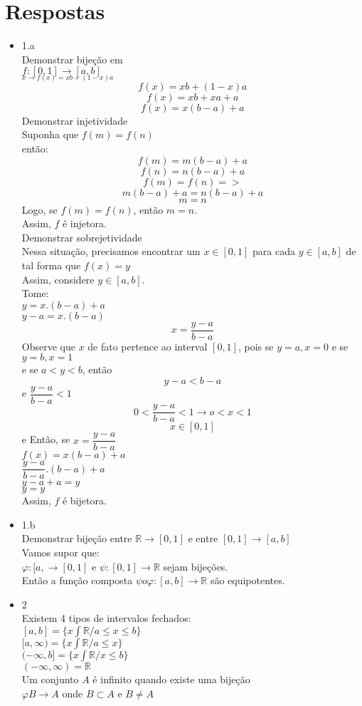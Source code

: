 \documentclass[]{article}
\begin{document}
	\section{Respostas}
	\begin{itemize}
		\item 1.a\\
			Demonstrar bijeção em\\
			$f:[0,1] \to [a,b]$\\			
			$_{x \to f(x) =xb+(1-x)a}$\\
			$$f(x) = xb+(1-x)a$$
			$$f(x) = xb +xa +a$$
			$$f(x) = x(b-a)+a$$
			Demonstrar injetividade\\
			Suponha que $f(m)=f(n)$\\
			então:
			$$f(m)=m(b-a)+a$$
			$$f(n) =n(b-a)+a$$
			$$f(m)=f(n) =>$$
			$$m(b-a)+a = n(b-a)+a$$
			$$m=n$$
			Logo, se $f(m)=f(n)$, então $m=n$.\\
			Assim, $f$ é injetora.\\
			Demonstrar sobrejetividade\\
			Nessa situação, precisamos encontrar um $x \in [0,1]$ para cada $y \in [a,b]$ de tal forma que $f(x) = y$\\
			Assim, considere $y \in [a,b]$.\\
			Tome:\\
			$y = x.(b-a)+a$\\
			$y-a = x.(b-a)$
			$$x = \dfrac{y-a}{b-a}$$
			Observe que $x$ de fato pertence ao interval $[0,1]$, pois se $y =a, x=0$ e se $y=b, x=1$\\
			e se $a<y<b$, então\\
			$$y-a < b-a$$
			e $\dfrac{y-a}{b-a}<1$
			$$0<\dfrac{y-a}{b-a}<1 \to o<x<1$$
			$$x \in [0,1]$$
			e Então, se $x = \dfrac{y-a}{b-a}$\\
			$f(x) = x(b-a) + a$\\
			$\dfrac{y-a}{b-a}.(b-a) +a$\\
			$y-a +a = y$\\
			$y=y$\\
			Assim, $f$ é bijetora.
		\item 1.b\\
			Demonstrar bijeção entre $\mathbb{R} \to [0,1]$ e entre $[0,1] \to [a,b]$\\
			Vamos supor que:\\
			$\varphi: [a,									 \to [0,1]$ e $\psi: [0,1] \to \mathbb{R}$ sejam bijeções.\\
			Então a função composta $\psi o \varphi : [a,b] \to \mathbb{R}$ são equipotentes.
		\item 2\\
			Existem 4 tipos de intervalos fechados:\\
			$[a,b] = \{x \int \mathbb{R}/a\leq x \leq b\}$\\
			$[a,\infty) = \{x \int \mathbb{R}/a\leq x \}$\\
			$(-\infty ,b] = \{x \int \mathbb{R}/x \leq b\}$\\
			$(-\infty,\infty) = \mathbb{R}$\\
			Um conjunto $A$ é infinito quando existe uma bijeção\\
			$\varphi B \to A$ onde $B  \subset A$ e $B \not = A$
	\end{itemize}
\end{document}
